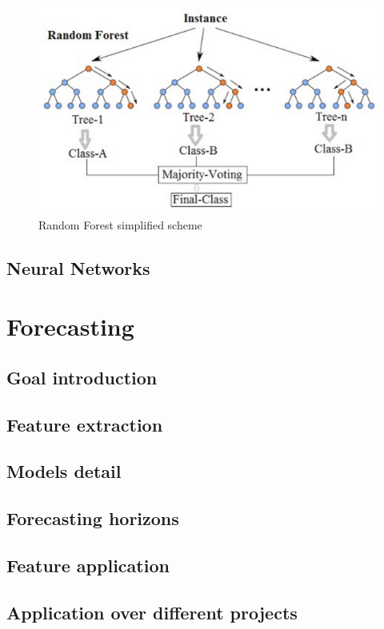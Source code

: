 \documentclass[%
    corpo=12pt,
    twoside,
    oldstyle,
    autoretitolo,
    greek,
    evenboxes,
]{toptesi}
\begin{document}
\begin{figure}[!h]
  \includegraphics[width=\linewidth]{figure/rf.png}
  \caption{Random Forest simplified scheme}
  \label{fig:rf}
\end{figure}

\section{Neural Networks}



\chapter{Forecasting}
\section{Goal introduction}
\section{Feature extraction}
\section{Models detail}
\section{Forecasting horizons}
\section{Feature application}
\section{Application over different projects}
\end{document}
